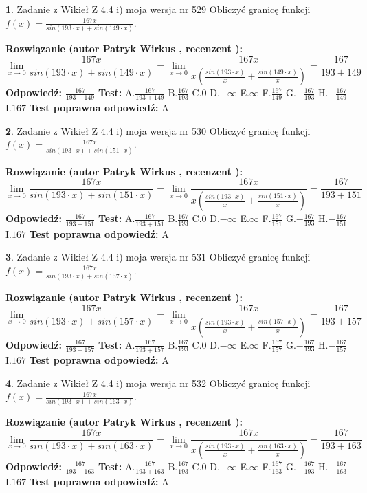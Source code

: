 \documentclass[12pt, a4paper]{article}
\theoremstyle{definition} %
\newtheorem{zad}{}
\newcommand{\zadStart}[1]{\begin{zad}#1\newline}
\newcommand{\zadStop}{\end{zad}}
\newcommand{\rozwStart}[2]{\noindent \textbf{Rozwiązanie (autor #1 , recenzent #2): }\newline}
\newcommand{\rozwStop}{\newline}
\newcommand{\odpStart}{\noindent \textbf{Odpowiedź:}\newline}
\newcommand{\odpStop}{\newline}
\newcommand{\testStart}{\noindent \textbf{Test:}\newline}
\newcommand{\testStop}{\newline}
\newcommand{\kluczStart}{\noindent \textbf{Test poprawna odpowiedź:}\newline}
\newcommand{\kluczStop}{\newline}
\begin{document}
\zadStart{Zadanie z Wikieł Z 4.4 i) moja wersja nr 529}
Obliczyć granicę funkcji $f(x)=\frac{167x}{sin(193\cdot x) +sin(149\cdot x)}$.
\zadStop
\rozwStart{Patryk Wirkus}{}
$$\lim\limits_{x\to 0}\frac{167x}{sin(193\cdot x) +sin(149\cdot x)}=\lim\limits_{x\to 0}\frac{167x}{x(\frac{sin(193\cdot x)}{x}+\frac{sin(149\cdot x)}{x})}=\frac{167}{193+149}$$
\rozwStop
\odpStart
$\frac{167}{193+149}$
\odpStop
\testStart
A.$\frac{167}{193+149}$
B.$\frac{167}{193}$
C.$0$
D.$-\infty$
E.$\infty$
F.$\frac{167}{149}$
G.$-\frac{167}{193}$
H.$-\frac{167}{149}$
I.$167$
\testStop
\kluczStart
A
\kluczStop



\zadStart{Zadanie z Wikieł Z 4.4 i) moja wersja nr 530}
Obliczyć granicę funkcji $f(x)=\frac{167x}{sin(193\cdot x) +sin(151\cdot x)}$.
\zadStop
\rozwStart{Patryk Wirkus}{}
$$\lim\limits_{x\to 0}\frac{167x}{sin(193\cdot x) +sin(151\cdot x)}=\lim\limits_{x\to 0}\frac{167x}{x(\frac{sin(193\cdot x)}{x}+\frac{sin(151\cdot x)}{x})}=\frac{167}{193+151}$$
\rozwStop
\odpStart
$\frac{167}{193+151}$
\odpStop
\testStart
A.$\frac{167}{193+151}$
B.$\frac{167}{193}$
C.$0$
D.$-\infty$
E.$\infty$
F.$\frac{167}{151}$
G.$-\frac{167}{193}$
H.$-\frac{167}{151}$
I.$167$
\testStop
\kluczStart
A
\kluczStop



\zadStart{Zadanie z Wikieł Z 4.4 i) moja wersja nr 531}
Obliczyć granicę funkcji $f(x)=\frac{167x}{sin(193\cdot x) +sin(157\cdot x)}$.
\zadStop
\rozwStart{Patryk Wirkus}{}
$$\lim\limits_{x\to 0}\frac{167x}{sin(193\cdot x) +sin(157\cdot x)}=\lim\limits_{x\to 0}\frac{167x}{x(\frac{sin(193\cdot x)}{x}+\frac{sin(157\cdot x)}{x})}=\frac{167}{193+157}$$
\rozwStop
\odpStart
$\frac{167}{193+157}$
\odpStop
\testStart
A.$\frac{167}{193+157}$
B.$\frac{167}{193}$
C.$0$
D.$-\infty$
E.$\infty$
F.$\frac{167}{157}$
G.$-\frac{167}{193}$
H.$-\frac{167}{157}$
I.$167$
\testStop
\kluczStart
A
\kluczStop



\zadStart{Zadanie z Wikieł Z 4.4 i) moja wersja nr 532}
Obliczyć granicę funkcji $f(x)=\frac{167x}{sin(193\cdot x) +sin(163\cdot x)}$.
\zadStop
\rozwStart{Patryk Wirkus}{}
$$\lim\limits_{x\to 0}\frac{167x}{sin(193\cdot x) +sin(163\cdot x)}=\lim\limits_{x\to 0}\frac{167x}{x(\frac{sin(193\cdot x)}{x}+\frac{sin(163\cdot x)}{x})}=\frac{167}{193+163}$$
\rozwStop
\odpStart
$\frac{167}{193+163}$
\odpStop
\testStart
A.$\frac{167}{193+163}$
B.$\frac{167}{193}$
C.$0$
D.$-\infty$
E.$\infty$
F.$\frac{167}{163}$
G.$-\frac{167}{193}$
H.$-\frac{167}{163}$
I.$167$
\testStop
\kluczStart
A
\kluczStop
\end{document}
